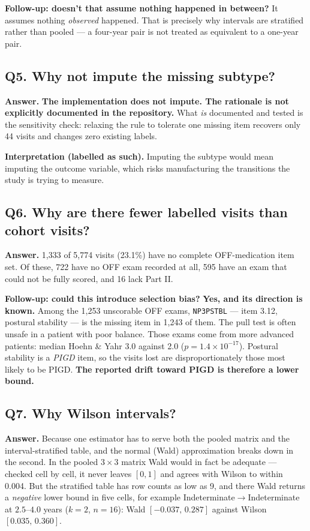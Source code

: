 \documentclass[11pt,a4paper]{article}
\newcommand{\code}[1]{\texttt{\small #1}}
\newcommand{\arr}{$\rightarrow$}
\begin{document}
\textbf{Follow-up: doesn't that assume nothing happened in between?} It assumes
nothing \emph{observed} happened. That is precisely why intervals are
stratified rather than pooled --- a four-year pair is not treated as equivalent
to a one-year pair.

\subsection*{Q5. Why not impute the missing subtype?}
\textbf{Answer.} \textbf{The implementation does not impute. The rationale is
not explicitly documented in the repository.} What \emph{is} documented and
tested is the sensitivity check: relaxing the rule to tolerate one missing item
recovers only 44 visits and changes zero existing labels.

\textbf{Interpretation (labelled as such).} Imputing the subtype would mean
imputing the outcome variable, which risks manufacturing the transitions the
study is trying to measure.

\subsection*{Q6. Why are there fewer labelled visits than cohort visits?}
\textbf{Answer.} 1{,}333 of 5{,}774 visits (23.1\%) have no complete
OFF-medication item set. Of these, 722 have no OFF exam recorded at all, 595
have an exam that could not be fully scored, and 16 lack Part II.

\textbf{Follow-up: could this introduce selection bias?} \textbf{Yes, and its
direction is known.} Among the 1{,}253 unscorable OFF exams, \code{NP3PSTBL}
--- item 3.12, postural stability --- is the missing item in 1{,}243 of them.
The pull test is often unsafe in a patient with poor balance. Those exams come
from more advanced patients: median Hoehn \& Yahr 3.0 against 2.0
($p = 1.4\times10^{-17}$). Postural stability is a \emph{PIGD} item, so the
visits lost are disproportionately those most likely to be PIGD. \textbf{The
reported drift toward PIGD is therefore a lower bound.}

\subsection*{Q7. Why Wilson intervals?}
\textbf{Answer.} Because one estimator has to serve both the pooled matrix and
the interval-stratified table, and the normal (Wald) approximation breaks down
in the second. In the pooled $3\times3$ matrix Wald would in fact be adequate
--- checked cell by cell, it never leaves $[0,1]$ and agrees with Wilson to
within 0.004. But the stratified table has row counts as low as 9, and there
Wald returns a \emph{negative} lower bound in five cells, for example
Indeterminate\arr Indeterminate at $2.5$--$4.0$ years ($k=2$, $n=16$):
Wald $[-0.037,\, 0.287]$ against Wilson $[0.035,\, 0.360]$.
\end{document}
